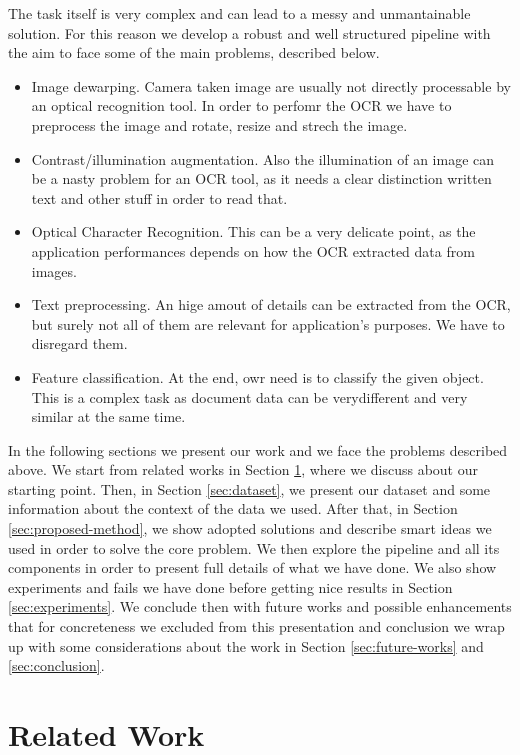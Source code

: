\documentclass[10pt,twocolumn,letterpaper]{article}
\begin{document}
The task itself is very complex and can lead to a messy and
unmantainable solution. For this reason we develop a robust and well
structured pipeline with the aim to face some of the main problems,
described below.
\begin{itemize}
  \item Image dewarping. Camera taken image are usually not directly
    processable by an optical recognition tool. In order to perfomr
    the OCR we have to preprocess the image and rotate, resize and
    strech the image.
  \item Contrast/illumination augmentation. Also the illumination of an
    image can be a nasty problem for an OCR tool, as it needs a clear
    distinction written text and other stuff in order to read that.
  \item Optical Character Recognition. This can be a very delicate
    point, as the application performances depends on how the OCR
    extracted data from images.
  \item Text preprocessing. An hige amout of details can be extracted
    from the OCR, but surely not all of them are relevant for
    application's purposes. We have to disregard them.
  \item Feature classification. At the end, owr need is to classify the
    given object. This is a complex task as document data can be verydifferent and very similar at the same time.
\end{itemize}

In the following sections we present our work and we face the problems
described above. We start from related works in Section
\ref{sec:related-work}, where we discuss about our starting
point. Then, in Section \ref{sec:dataset}, we present our dataset and
some information about the context of the data we used. After that, in
Section \ref{sec:proposed-method}, we show adopted solutions and
describe smart ideas we used in order to solve the core problem. We
then explore the pipeline and all its components in order to present
full details of what we have done. We also show experiments and fails
we have done before getting nice results in Section
\ref{sec:experiments}. We conclude then with future works and possible
enhancements that for concreteness we excluded from this presentation
and conclusion we wrap up with some considerations about the work in
Section \ref{sec:future-works} and \ref{sec:conclusion}.

\section{Related Work}
\label{sec:related-work}
\end{document}
